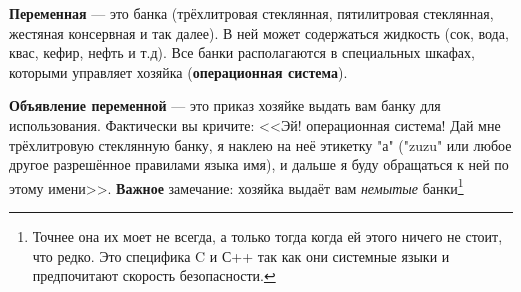 \documentclass[12pt]{article}
\begin{document}
\textbf{Переменная} --- это банка (трёхлитровая стеклянная, пятилитровая стеклянная, жестяная консервная и так далее). В ней может содержаться жидкость (сок, вода, квас, кефир, нефть и т.д). Все банки располагаются в специальных шкафах, которыми управляет хозяйка (\textbf{операционная система}). 

\textbf{Объявление переменной} --- это приказ хозяйке выдать вам банку для использования. Фактически вы кричите: <<Эй! операционная система! Дай мне трёхлитровую стеклянную банку, я наклею на неё этикетку "а" ("zuzu" или любое другое разрешённое правилами языка имя), и дальше я буду обращаться к ней по этому имени>>. \textbf{Важное} замечание: хозяйка выдаёт вам \textit{немытые} банки\footnote{Точнее она их моет не всегда, а только тогда когда ей этого ничего не стоит, что редко. Это специфика C и С++ так как они системные языки и предпочитают скорость безопасности.}
\end{document}

